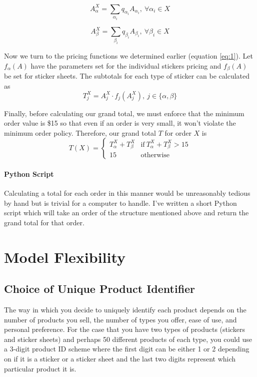\documentclass{article}
\begin{document}
\begin{equation}\label{eq:2}
A_\alpha^X = \sum_{\alpha_i} q_{\alpha_i} A_{\alpha_i}, \ \forall \alpha_i \in X
\end{equation}

\begin{equation}\label{eq:3}
A_\beta^X = \sum_{\beta_i} q_{\beta_i} A_{\beta_i}, \ \forall \beta_i \in X
\end{equation}

Now we turn to the pricing functions we determined earlier (equation \ref{eq:1}). Let $f_\alpha(A)$ have the parameters set for the individual stickers pricing and $f_\beta(A)$ be set for sticker sheets. The subtotals for each type of sticker can be calculated as
\begin{equation}\label{eq:4}
T_j^X = A_j^X \cdot f_j(A_j^X),\ j \in \{\alpha, \beta \}
\end{equation}

Finally, before calculating our grand total, we must enforce that the minimum order value is \$15 so that even if an order is very small, it won't violate the minimum order policy. Therefore, our grand total $T$ for order $X$ is 
\begin{equation}\label{eq:5}
T(X) =
  \begin{cases}
   T_\alpha^X + T_\beta^X & \text{if} \ T_\alpha^X + T_\beta^X > 15 \\
        15 & \text{otherwise}
  \end{cases}
\end{equation}

\paragraph{Python Script}
Calculating a total for each order in this manner would be unreasonably tedious by hand but is trivial for a computer to handle. I've written a short Python script which will take an order of the structure mentioned above and return the grand total for that order.

\section{Model Flexibility}
\subsection{Choice of Unique Product Identifier}
The way in which you decide to uniquely identify each product depends on the number of products you sell, the number of types you offer, ease of use, and personal preference. For the case that you have two types of products (stickers and sticker sheets) and perhaps 50 different products of each type, you could use a 3-digit product ID scheme where the first digit can be either 1 or 2 depending on if it is a sticker or a sticker sheet and the last two digits represent which particular product it is. 
\end{document}
